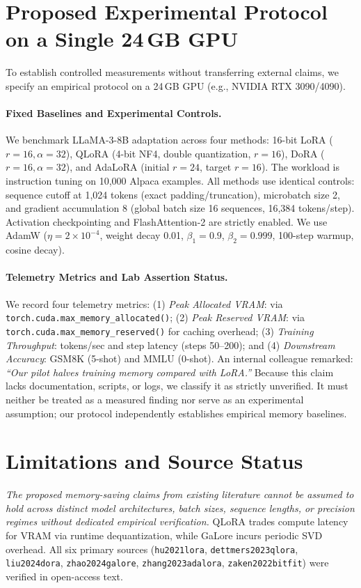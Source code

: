 \documentclass[11pt,a4paper]{article}
\begin{document}
\section{Proposed Experimental Protocol on a Single 24\,GB GPU}
To establish controlled measurements without transferring external claims, we specify an empirical protocol on a 24\,GB GPU (e.g., NVIDIA RTX 3090/4090).

\paragraph{Fixed Baselines and Experimental Controls.}
We benchmark LLaMA-3-8B adaptation across four methods: 16-bit LoRA ($r=16, \alpha=32$), QLoRA (4-bit NF4, double quantization, $r=16$), DoRA ($r=16, \alpha=32$), and AdaLoRA (initial $r=24$, target $r=16$). The workload is instruction tuning on 10,000 Alpaca examples. All methods use identical controls: sequence cutoff at 1,024 tokens (exact padding/truncation), microbatch size 2, and gradient accumulation 8 (global batch size 16 sequences, 16,384 tokens/step). Activation checkpointing and FlashAttention-2 are strictly enabled. We use AdamW ($\eta = 2 \times 10^{-4}$, weight decay 0.01, $\beta_1 = 0.9$, $\beta_2 = 0.999$, 100-step warmup, cosine decay).

\paragraph{Telemetry Metrics and Lab Assertion Status.}
We record four telemetry metrics: (1) \textit{Peak Allocated VRAM}: via \texttt{torch.\allowbreak cuda.\allowbreak max\_memory\_allocated()}; (2) \textit{Peak Reserved VRAM}: via \texttt{torch.\allowbreak cuda.\allowbreak max\_memory\_reserved()} for caching overhead; (3) \textit{Training Throughput}: tokens/sec and step latency (steps 50--200); and (4) \textit{Downstream Accuracy}: GSM8K (5-shot) and MMLU (0-shot). An internal colleague remarked: \textit{``Our pilot halves training memory compared with LoRA.''} Because this claim lacks documentation, scripts, or logs, we classify it as strictly unverified. It must neither be treated as a measured finding nor serve as an experimental assumption; our protocol independently establishes empirical memory baselines.

\section{Limitations and Source Status}
\textit{The proposed memory-saving claims from existing literature cannot be assumed to hold across distinct model architectures, batch sizes, sequence lengths, or precision regimes without dedicated empirical verification.} QLoRA trades compute latency for VRAM via runtime dequantization, while GaLore incurs periodic SVD overhead. All six primary sources (\texttt{hu2021lora}, \texttt{dettmers2023qlora}, \texttt{liu2024dora}, \texttt{zhao2024galore}, \texttt{zhang2023adalora}, \texttt{zaken2022bitfit}) were verified in open-access text.



\end{document}

